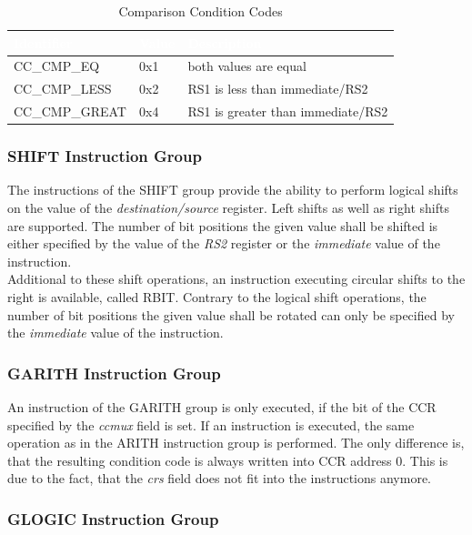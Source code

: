 \begin{table}[htb]
\centering
\begin{tabular}{|l| l| l|}
    \hline
    \rowcolor{black!70}
    \textcolor{white}{\textbf{Identifier}} & \textcolor{white}{\textbf{Value}} & \textcolor{white}{\textbf{Description}} \\
    \hline
    CC\_CMP\_EQ    & 0x1 & both values are equal\\
    \hline
    \rowcolor{black!10}
    CC\_CMP\_LESS  & 0x2 & RS1 is less than immediate/RS2 \\
    \hline
    CC\_CMP\_GREAT & 0x4 & RS1 is greater than immediate/RS2 \\
    \hline
\end{tabular}
\caption{Comparison Condition Codes} \label{cmp_cond}
\end{table}

\subsubsection{SHIFT Instruction Group}

The instructions of the SHIFT group provide the ability to perform logical shifts on the value of the \emph{destination/source} register.
Left shifts as well as right shifts are supported.
The number of bit positions the given value shall be shifted is either specified by the value of the \emph{RS2} register or the \emph{immediate} value of the instruction.\\
Additional to these shift operations, an instruction executing circular shifts to the right is available, called RBIT.
Contrary to the logical shift operations, the number of bit positions the given value shall be rotated can only be specified by the \emph{immediate} value of the instruction.

\subsubsection{GARITH Instruction Group}

An instruction of the GARITH group is only executed, if the bit of the CCR specified by the \emph{ccmux} field is set.
If an instruction is executed, the same operation as in the ARITH instruction group is performed.
The only difference is, that the resulting condition code is always written into CCR address 0.
This is due to the fact, that the \emph{crs} field does not fit into the instructions anymore.

\subsubsection{GLOGIC Instruction Group}

